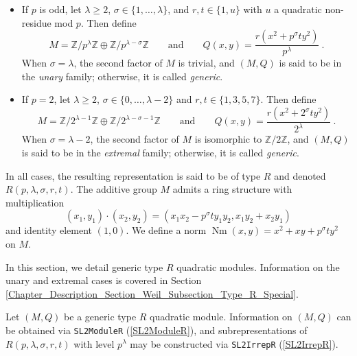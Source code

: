 \documentclass[a4paper,11pt]{report}
\begin{document}
{{{ 
\begin{itemize}
\item If $p$ is odd, let $\lambda \geq 2$, $\sigma \in \{1, \dots, \lambda\}$, and $r,t \in \{1,u\}$ with $u$ a quadratic non-residue mod $p$. Then define 
\[M = \mathbb{Z}/p^\lambda\mathbb{Z} \oplus
\mathbb{Z}/p^{\lambda-\sigma}\mathbb{Z} \qquad \text{and} \qquad Q(x,y) =
\frac{r(x^2 + p^\sigma t y^2)}{p^\lambda}~.\]
 When $\sigma = \lambda$, the second factor of $M$ is trivial, and $(M,Q)$ is said to be in the \emph{unary} family; otherwise, it is called \emph{generic}.
\item If $p=2$, let $\lambda \geq 2$, $\sigma \in \{0, \dots, \lambda-2\}$ and $r,t \in \{1,3,5,7\}$. Then define 
\[M = \mathbb{Z}/2^{\lambda-1}\mathbb{Z} \oplus
\mathbb{Z}/2^{\lambda-\sigma-1}\mathbb{Z} \qquad \text{and} \qquad Q(x,y) =
\frac{r(x^2 + 2^\sigma t y^2)}{2^\lambda}~.\]
 When $\sigma = \lambda - 2$, the second factor of $M$ is isomorphic to $\mathbb{Z}/2\mathbb{Z}$, and $(M,Q)$ is said to be in the \emph{extremal} family; otherwise, it is called \emph{generic}.
\end{itemize}
 

 In all cases, the resulting representation is said to be of type $R$ and denoted $R(p,\lambda,\sigma,r,t)$. The additive group $M$ admits a ring structure with multiplication 
\[(x_1, y_1) \cdot (x_2, y_2) = (x_1x_2 - p^\sigma ty_1y_2, x_1y_2 + x_2y_1)\]
 and identity element $(1,0)$. We define a norm $\operatorname{Nm}(x,y) = x^2 + xy + p^\sigma t y^2$ on $M$. 

 In this section, we detail generic type $R$ quadratic modules. Information on the unary and extremal cases is covered in
Section \ref{Chapter_Description_Section_Weil_Subsection_Type_R_Special}. 

 Let $(M,Q)$ be a generic type $R$ quadratic module. Information on $(M,Q)$ can be obtained via \texttt{SL2ModuleR} (\ref{SL2ModuleR}), and subrepresentations of $R(p,\lambda,\sigma,r,t)$ with level $p^\lambda$ may be constructed via \texttt{SL2IrrepR} (\ref{SL2IrrepR}). 

}}}
\end{document}
